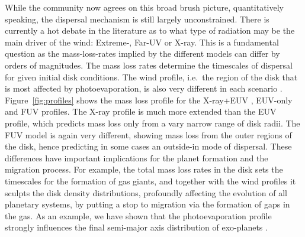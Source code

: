 \documentclass[10pt,fleqn,twoside]{article}
\begin{document}
While the community now agrees on this broad brush picture,
quantitatively speaking, the dispersal mechanism is still largely
unconstrained. There is currently a hot debate in the literature as to
what type of radiation may be the main driver of the wind: Extreme-,
Far-UV or X-ray. This is a fundamental question as the mass-loss-rates
implied by the different models can differ by orders of
magnitudes. The mass loss rates determine the timescales of dispersal for
given initial disk conditions. The wind profile, i.e.\ the region of
the disk that is most affected by photoevaporation, is also very
different in each scenario 
\citep[e.g.][]{2014prpl.conf..475A, 2011ARA&A..49..195A}.
Figure~\ref{fig:profiles} shows the mass loss profile for the X-ray+EUV
\citep{2010MNRAS.401.1415O},
EUV-only 
\citep{2004ApJ...607..890F}
and FUV
\citep{2009ApJ...705.1237G}
profiles. The X-ray profile is much
more extended than the EUV profile, which predicts mass loss only from
a vary narrow range of disk radii. The FUV model is again very
different, showing mass loss from the outer regions of the disk, hence
predicting in some cases an outside-in mode of dispersal. These
differences have important implications for the planet formation and
the migration 
process. For example, the total
mass loss rates in the disk sets the timescales for the formation of
gas giants, and together with the wind
profiles it sculpts the disk density distributions, profoundly affecting
the evolution of all planetary systems, by putting a stop to migration via
the formation of gaps in the gas. As an example, we have shown that
the photoevaporation profile strongly influences the final semi-major
axis distribution of exo-planets 
\citep{2015MNRAS.450.3008E}.
\end{document}
